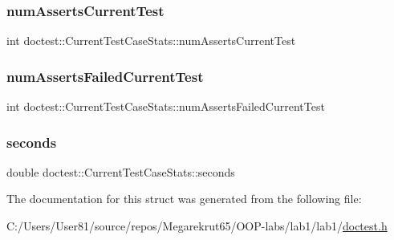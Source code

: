 \subsubsection{\texorpdfstring{num\+Asserts\+Current\+Test}{numAssertsCurrentTest}}
{\footnotesize\ttfamily int doctest\+::\+Current\+Test\+Case\+Stats\+::num\+Asserts\+Current\+Test}

\mbox{\label{structdoctest_1_1_current_test_case_stats_a2fb52eed7bcef7322a816f418f0fb942}} 
\subsubsection{\texorpdfstring{num\+Asserts\+Failed\+Current\+Test}{numAssertsFailedCurrentTest}}
{\footnotesize\ttfamily int doctest\+::\+Current\+Test\+Case\+Stats\+::num\+Asserts\+Failed\+Current\+Test}

\mbox{\label{structdoctest_1_1_current_test_case_stats_a29b1963f1d624d9f939f404726298f48}} 
\subsubsection{\texorpdfstring{seconds}{seconds}}
{\footnotesize\ttfamily double doctest\+::\+Current\+Test\+Case\+Stats\+::seconds}



The documentation for this struct was generated from the following file\+:\begin{DoxyCompactItemize}
\item 
C\+:/\+Users/\+User81/source/repos/\+Megarekrut65/\+O\+O\+P-\/labs/lab1/lab1/\mbox{\hyperlink{doctest_8h}{doctest.\+h}}\end{DoxyCompactItemize}
